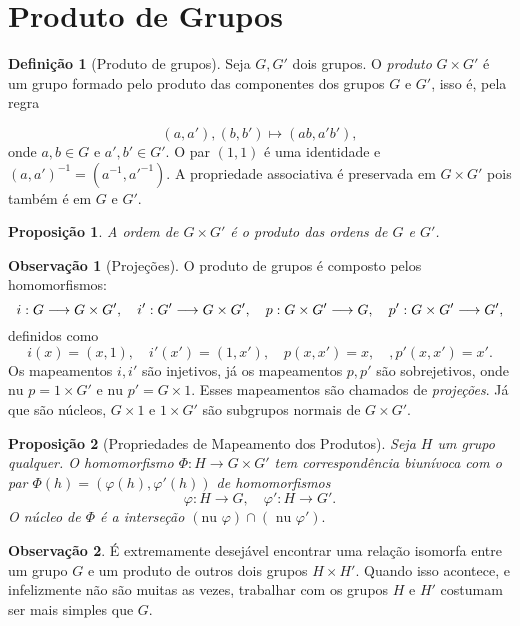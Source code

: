 \documentclass[a4paper,12pt]{report}
\theoremstyle{plain}
\newtheorem{proposicao}{Proposição}[section]
\theoremstyle{definition}
\newtheorem{definicao}{Definição}[section]
\newtheorem{observacao}{Observação}[section]
\begin{document}
\section{Produto de Grupos}

\begin{definicao}[Produto de grupos]
	Seja \(G,G'\) dois grupos. O \emph{produto}
	\(G\times G'\) é um grupo formado pelo produto das componentes dos
	grupos \(G\) e \(G'\), isso é, pela regra
	
	\[ (a,a'), (b,b') \mapsto (ab,a'b'), \] onde \(a,b \in G\) e
	\(a',b'\in G'\). O par \((1,1)\) é uma identidade e
	\((a,a')^{-1} = (a^{-1},a'^{-1})\). A propriedade associativa é
	preservada em \(G\times G'\) pois também é em \(G\) e \(G'\).
\end{definicao}

\begin{proposicao}
	A ordem de \(G\times G'\) é o produto das ordens de
	\(G\) e \(G'\).	
\end{proposicao}

\begin{observacao}[Projeções]
	O produto de grupos é composto pelos homomorfismos:
	\[i: G\longrightarrow G\times G', \quad i': G'\longrightarrow G\times G', \newline \quad p: G\times G'\longrightarrow G, \quad p': G\times G'\longrightarrow G',\]
	definidos como
	\[i(x) = (x,1), \quad i'(x') = (1,x'), \quad p(x,x') = x, \quad, p'(x,x') = x'.\]
	Os mapeamentos \(i,i'\) são injetivos, já os mapeamentos \(p,p'\) são
	sobrejetivos, onde \(\text{nu }p = 1\times G'\) e
	\(\text{nu }p' = G\times 1\). Esses mapeamentos são chamados de
	\emph{projeções}. Já que são núcleos, \(G\times 1\) e \(1\times G'\)
	são subgrupos normais de \(G\times G'\).
\end{observacao}

\begin{proposicao}[Propriedades de Mapeamento dos Produtos]
	Seja
	\(H\) um grupo qualquer. O homomorfismo
	\(\Phi: H\longrightarrow G\times G'\) tem correspondência biunívoca com
	o par $ \Phi(h) = (\varphi(h), \varphi'(h))$ de homomorfismos
	\[\varphi:H\longrightarrow G, \quad \varphi': H\longrightarrow G'.\]
	O núcleo de \(\Phi\) é a interseção
	\((\text{nu }\varphi)\cap(\text{ nu }\varphi').\)	
\end{proposicao}

\begin{observacao}
	É extremamente desejável encontrar uma relação isomorfa entre um grupo
	\(G\) e um produto de outros dois grupos \(H\times H'\). Quando isso
	acontece, e infelizmente não são muitas as vezes, trabalhar com os
	grupos \(H\) e \(H'\) costumam ser mais simples que \(G\).
\end{observacao}
\end{document}
